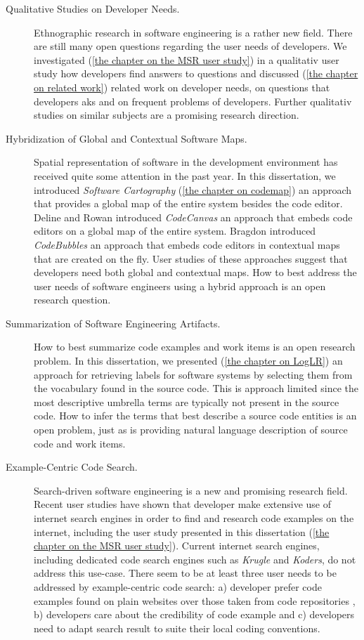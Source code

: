 \begin{description}
\item[Qualitative Studies on Developer Needs.] 
%
Ethnographic research in software engineering is a rather new field. There are still many open questions regarding the user needs of developers. We investigated (\autoref{the chapter on the MSR user study}) in a qualitativ user study how developers find answers to questions and discussed (\autoref{the chapter on related work}) related work on developer needs, on questions that developers aks and on frequent problems of developers. Further qualitativ studies on similar subjects are a promising research direction.

\item[Hybridization of Global and Contextual Software Maps.] 
%
Spatial representation of software in the development environment has received quite some attention in the past year. In this dissertation, we introduced \emph{Software Cartography} (\autoref{the chapter on codemap}) an approach that provides a global map of the entire system besides the code editor. Deline and Rowan introduced \emph{CodeCanvas} \cite{Deli10a} an approach that embeds code editors on a global map of the entire system. Bragdon \etal introduced \emph{CodeBubbles} \cite{Brag10a,Brag10b} an approach that embeds code editors in contextual maps that are created on the fly. User studies of these approaches suggest that developers need both global and contextual maps. How to best address the user needs of software engineers using a hybrid approach is an open research question. 

\item[Summarization of Software Engineering Artifacts.] 
%
How to best summarize code examples and work items is an open research problem.
In this dissertation, we presented (\autoref{the chapter on LogLR}) an approach for retrieving labels for software systems by selecting them from the vocabulary found in the source code. This is approach limited since the most descriptive umbrella terms are typically not present in the source code. How to infer the terms that best describe a source code entities is an open problem, just as is providing natural language description of source code and work items.

\item[Example-Centric Code Search.] Search-driven software engineering is a new and promising research field. Recent user studies have shown that developer make extensive use of internet search engines in order to find and research code examples on the internet, including the user study presented in this dissertation (\autoref{the chapter on the MSR user study}). Current internet search engines, including dedicated code search engines such as \emph{Krugle} and \emph{Koders}, do not address this use-case. There seem to be at least three user needs to be addressed by example-centric code search: a) developer prefer code examples found on plain websites over those taken from code repositories , b) developers care about the credibility of code example and c) developers need to adapt search result to suite their local coding conventions. 


\end{description}
